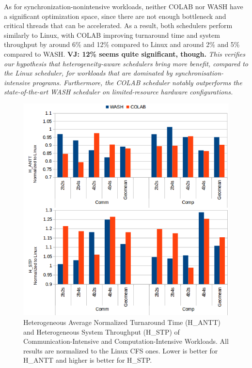 As for synchronization-nonintensive workloads, neither COLAB nor WASH have a significant optimization space, since there are not enough bottleneck and critical threads that can be accelerated. As a result, both schedulers perform similarly to Linux, with COLAB improving turnaround time and system throughput by around 6\% and 12\% compared to Linux and around 2\% and 5\% compared to WASH. \textbf{VJ: 12\% seems quite significant, though.} \textit{This verifies our hypothesis that heterogeneity-aware schedulers bring more benefit, compared to the Linux scheduler, for workloads that are dominated by synchronisation-intensive programs. Furthermore, the COLAB scheduler notably outperforms the state-of-the-art WASH scheduler on limited-resource hardware configurations.}

\begin{figure}
\centering
\includegraphics[scale=0.39]{figures/com.png}
\caption{Heterogeneous Average Normalized Turnaround Time (H\_ANTT) and Heterogeneous System Throughput (H\_STP) of Communication-Intensive and Computation-Intensive Workloads. All results are normalized to the Linux CFS ones. Lower is better for H\_ANTT and higher is better for H\_STP.}
\label{com}
\end{figure} 

